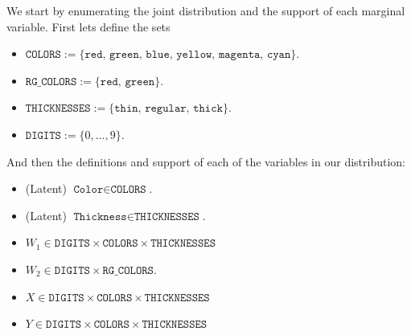 \documentclass{article}
\theoremstyle{plain}
\theoremstyle{definition}
\theoremstyle{remark}
\begin{document}
	We start by enumerating the joint distribution and the support of each marginal variable. First lets define the sets 
	\begin{itemize}
		\item $\texttt{COLORS}:= \{\texttt{red, green, blue, yellow, magenta, cyan}\}$.
		\item $\texttt{RG\_COLORS}:= \{\texttt{red, green}\}$.
		\item $\texttt{THICKNESSES}:= \{\texttt{thin, regular, thick}\}$.
		\item $\texttt{DIGITS}:= \{0,\dots, 9\}$.
	\end{itemize}
	And then the definitions and support of each of the variables in our distribution:
	\begin{itemize}
		\item (Latent) $\texttt{Color} \in \texttt{COLORS}$.
		\item (Latent) $\texttt{Thickness} \in \texttt{THICKNESSES}$.
		\item $W_1 \in \texttt{DIGITS}\times \texttt{COLORS}\times \texttt{THICKNESSES}$
		\item $W_2 \in \texttt{DIGITS}\times \texttt{RG\_COLORS}$.
		\item $X \in \texttt{DIGITS}\times \texttt{COLORS}\times \texttt{THICKNESSES}$
		\item $Y \in \texttt{DIGITS}\times \texttt{COLORS}\times \texttt{THICKNESSES}$
	\end{itemize}
	
\end{document}
